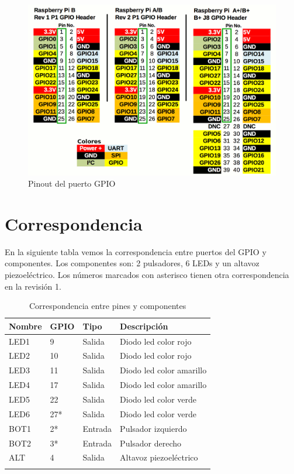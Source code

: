 \begin{figure}[h]
  \centering
    \includegraphics[width=14cm]{graphs/RaspberryGPIO.png}
  \caption{Pinout del puerto GPIO}
  \label{fig:pinout}
\end{figure}

\section{Correspondencia}

En la siguiente tabla vemos la correspondencia entre puertos del GPIO y
componentes. Los componentes son: 2 pulsadores, 6 LEDs y un altavoz
piezoeléctrico. Los números marcados con asterisco tienen otra
correspondencia en la revisión 1.

\begin{longtable}{ p{1.8cm} | p{1.2cm} | p{2cm} | p{5cm}}
\hline
{\bf Nombre} & {\bf GPIO} & {\bf Tipo} & {\bf Descripción} \\ \hline
LED1 & 9 & Salida & Diodo led color rojo \\ \hline
LED2 & 10 & Salida & Diodo led color rojo \\ \hline
LED3 & 11 & Salida & Diodo led color amarillo \\ \hline
LED4 & 17 & Salida & Diodo led color amarillo \\ \hline
LED5 & 22 & Salida & Diodo led color verde \\ \hline
LED6 & 27* & Salida & Diodo led color verde \\ \hline
BOT1 & 2* & Entrada & Pulsador izquierdo \\ \hline
BOT2 & 3* & Entrada & Pulsador derecho \\ \hline
ALT & 4 & Salida & Altavoz piezoeléctrico \\ \hline
\caption{Correspondencia entre pines y componentes}
\label{tab:berry}
\end{longtable}

